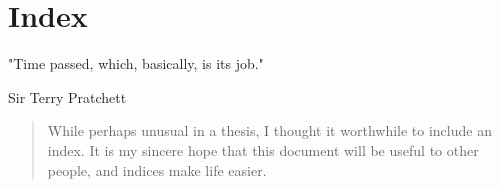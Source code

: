 \chapter{Index}

\epigraph{
    "Time passed, which, basically, is its job."
}{Sir Terry Pratchett}

\begin{abstract}
While perhaps unusual in a thesis, I thought it worthwhile to include an index. It is my sincere hope that this document will be useful to other people, and indices make life easier. 
\end{abstract}

\begin{multicols}{2}
\printindex
\end{multicols}